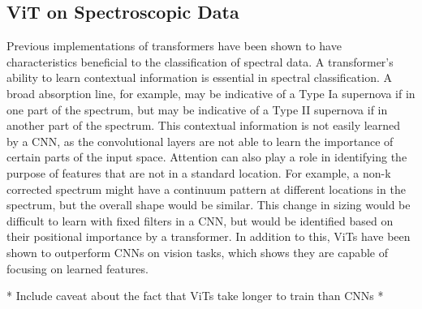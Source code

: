 \subsection{ViT on Spectroscopic Data}
\label{sec:ViT}
Previous implementations of transformers have been shown to have characteristics 
beneficial to the classification of spectral data. A transformer's 
ability to learn contextual information is essential in spectral classification. 
A broad absorption line, for example, may be indicative of a Type Ia supernova 
if in one part of the spectrum, but may be indicative of a Type II supernova if
in another part of the spectrum. This contextual information is not easily learned 
by a CNN, as the convolutional layers are not able to learn the importance of
certain parts of the input space. Attention can also play a role in identifying 
the purpose of features that are not in a standard location. For example, a 
non-k corrected spectrum might have a continuum pattern at different locations 
in the spectrum, but the overall shape would be similar. This change in sizing 
would be difficult to learn with fixed filters in a CNN, but would be identified 
based on their positional importance by a transformer. In addition to this, ViTs 
have been shown to outperform CNNs on vision tasks, which shows they are capable 
of focusing on learned features. 

* Include caveat about the fact that ViTs take longer to train than CNNs *

